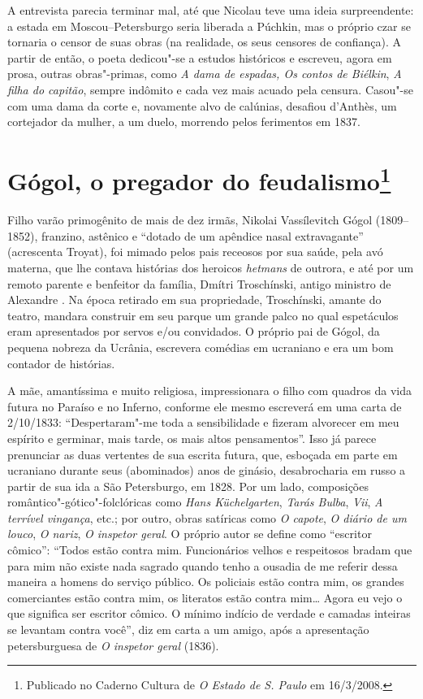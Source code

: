 A entrevista parecia terminar mal, até que Nicolau teve uma ideia
surpreendente: a estada em Moscou--Petersburgo seria liberada a Púchkin,
mas o próprio czar se tornaria o censor de suas obras (na realidade, os seus censores de confiança). A partir de então, o poeta dedicou"-se a
estudos históricos e escreveu, agora em prosa, outras obras"-primas,
como \emph{A dama de espadas, Os contos de Biélkin}, \emph{A filha do
capitão}, sempre indômito e cada vez mais acuado pela censura. Casou"-se com uma dama da corte e, novamente alvo de calúnias, desafiou d'Anthès, um cortejador da mulher, a um duelo, morrendo pelos ferimentos em 1837.



\chapter{Gógol, o pregador do feudalismo\footnote{Publicado no Caderno Cultura de \emph{O Estado de S. Paulo} em 16/3/2008.}}

Filho varão primogênito de mais de dez irmãs, Nikolai Vassílevitch
Gógol (1809--1852), franzino, astênico e ``dotado de um apêndice nasal
extravagante'' (acrescenta Troyat), foi mimado pelos pais receosos por sua saúde, pela avó materna, que lhe contava histórias dos heroicos \emph{hetmans} de outrora, e até por um remoto parente e benfeitor da família, Dmítri Troschínski, antigo ministro de Alexandre . Na época retirado em sua propriedade, Troschínski, amante do teatro, mandara construir em seu parque um grande palco no qual espetáculos eram apresentados por servos e/ou convidados. O próprio pai de Gógol, da pequena nobreza da Ucrânia, escrevera comédias em ucraniano e era um bom contador de histórias.

A mãe, amantíssima e muito religiosa, impressionara o filho com quadros da vida futura no Paraíso e no Inferno, conforme ele mesmo escreverá em uma carta de 2/10/1833: ``Despertaram"-me toda a sensibilidade e fizeram alvorecer em meu espírito e germinar, mais tarde, os mais altos pensamentos''. Isso já parece prenunciar as duas vertentes de sua escrita futura, que, esboçada em parte em ucraniano durante seus (abominados) anos de ginásio, desabrocharia em russo a partir de sua ida a São Petersburgo, em 1828. Por um lado, composições romântico"-gótico"-folclóricas como \emph{Hans Küchelgarten}, \emph{Tarás Bulba}, \emph{Vii}, \emph{A terrível vingança}, etc.; por outro, obras satíricas como \emph{O capote}, \emph{O diário de um louco}, \emph{O nariz}, \emph{O inspetor geral}. O próprio autor se define como ``escritor cômico'': ``Todos estão contra mim. Funcionários velhos e respeitosos bradam que para mim não existe nada sagrado quando tenho a ousadia de me referir dessa maneira a homens do serviço público. Os policiais estão contra mim, os grandes comerciantes estão contra mim, os literatos estão contra mim\ldots{} Agora eu vejo o que significa ser escritor cômico. O mínimo indício de verdade e camadas inteiras se levantam contra você'', diz em
carta a um amigo, após a apresentação petersburguesa de \emph{O inspetor geral} (1836).

